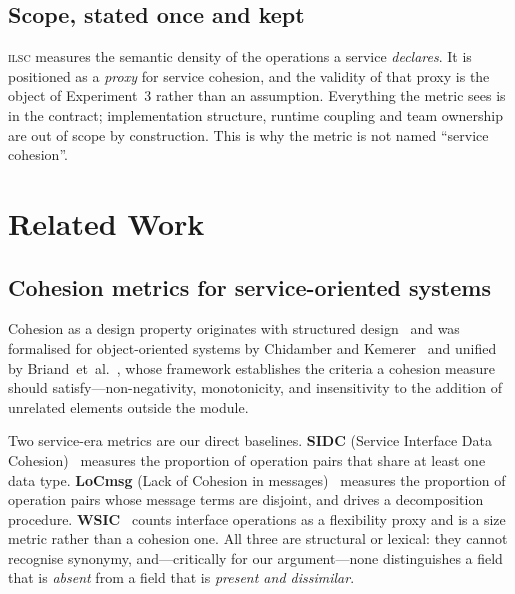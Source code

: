\documentclass[journal]{IEEEtran}
\newcommand{\ilsc}{\textsc{ilsc}}
\begin{document}
\subsection{Scope, stated once and kept}
\ilsc{} measures the semantic density of the operations a service
\emph{declares}. It is positioned as a \emph{proxy} for service cohesion, and
the validity of that proxy is the object of Experiment~3 rather than an
assumption. Everything the metric sees is in the contract; implementation
structure, runtime coupling and team ownership are out of scope by construction.
This is why the metric is not named ``service cohesion''.

\section{Related Work}
\label{sec:related}

\subsection{Cohesion metrics for service-oriented systems}
Cohesion as a design property originates with structured
design~\cite{stevens1974structured} and was formalised for object-oriented
systems by Chidamber and Kemerer~\cite{chidamber1994metrics} and unified by
Briand~et~al.~\cite{briand1998unified}, whose framework establishes the criteria
a cohesion measure should satisfy---non-negativity, monotonicity, and
insensitivity to the addition of unrelated elements outside the module.

Two service-era metrics are our direct baselines. \textbf{SIDC} (Service
Interface Data Cohesion)~\cite{perepletchikov2007cohesion} measures the
proportion of operation pairs that share at least one data type.
\textbf{LoCmsg} (Lack of Cohesion in
messages)~\cite{athanasopoulos2015cohesion} measures the proportion of operation
pairs whose message terms are disjoint, and drives a decomposition procedure.
\textbf{WSIC}~\cite{hirzalla2009metrics} counts interface operations as a
flexibility proxy and is a size metric rather than a cohesion one. All three are
structural or lexical: they cannot recognise synonymy, and---critically for our
argument---none distinguishes a field that is \emph{absent} from a field that is
\emph{present and dissimilar}.
\end{document}
